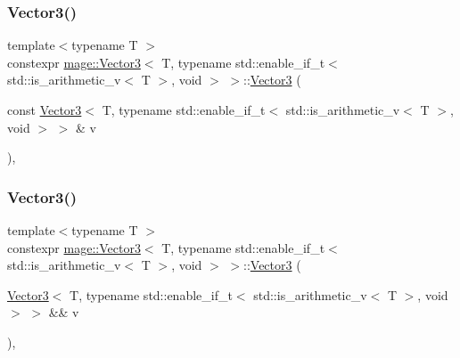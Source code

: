 \subsubsection{\texorpdfstring{Vector3()}{Vector3()}\hspace{0.1cm}{\footnotesize\ttfamily [5/7]}}
{\footnotesize\ttfamily template$<$typename T $>$ \\
constexpr \hyperlink{structmage_1_1_vector3}{mage\+::\+Vector3}$<$ T, typename std\+::enable\+\_\+if\+\_\+t$<$ std\+::is\+\_\+arithmetic\+\_\+v$<$ T $>$, void $>$ $>$\+::\hyperlink{structmage_1_1_vector3}{Vector3} (\begin{DoxyParamCaption}\item[{const \hyperlink{structmage_1_1_vector3}{Vector3}$<$ T, typename std\+::enable\+\_\+if\+\_\+t$<$ std\+::is\+\_\+arithmetic\+\_\+v$<$ T $>$, void $>$ $>$ \&}]{v }\end{DoxyParamCaption})\hspace{0.3cm}{\ttfamily [default]}, {\ttfamily [noexcept]}}

\hypertarget{structmage_1_1_vector3_3_01_t_00_01typename_01std_1_1enable__if__t_3_01std_1_1is__arithmetic__v_3_01_t_01_4_00_01void_01_4_01_4_a9acbe2a9130260361f9c3d93083d5bc1}{}\label{structmage_1_1_vector3_3_01_t_00_01typename_01std_1_1enable__if__t_3_01std_1_1is__arithmetic__v_3_01_t_01_4_00_01void_01_4_01_4_a9acbe2a9130260361f9c3d93083d5bc1} 
\subsubsection{\texorpdfstring{Vector3()}{Vector3()}\hspace{0.1cm}{\footnotesize\ttfamily [6/7]}}
{\footnotesize\ttfamily template$<$typename T $>$ \\
constexpr \hyperlink{structmage_1_1_vector3}{mage\+::\+Vector3}$<$ T, typename std\+::enable\+\_\+if\+\_\+t$<$ std\+::is\+\_\+arithmetic\+\_\+v$<$ T $>$, void $>$ $>$\+::\hyperlink{structmage_1_1_vector3}{Vector3} (\begin{DoxyParamCaption}\item[{\hyperlink{structmage_1_1_vector3}{Vector3}$<$ T, typename std\+::enable\+\_\+if\+\_\+t$<$ std\+::is\+\_\+arithmetic\+\_\+v$<$ T $>$, void $>$ $>$ \&\&}]{v }\end{DoxyParamCaption})\hspace{0.3cm}{\ttfamily [default]}, {\ttfamily [noexcept]}}

